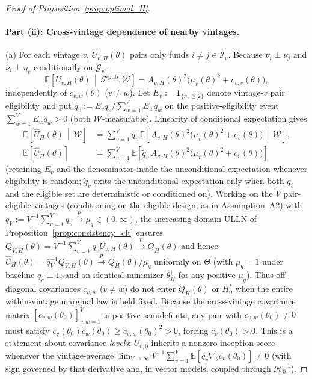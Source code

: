 \begin{proof}[Proof of Proposition~\ref{prop:optimal_H}]
\paragraph{Part (ii): Cross-vintage dependence of nearby vintages.}
(a) For each vintage $v$, $U_{v,H}(\theta)$ pairs only funds $i \neq j \in \mathcal{I}_v$. Because $\nu_i \perp \nu_j$ and $\nu_i \perp \eta_v$ conditionally on $\mathcal{G}_v$,
\[
\mathbb{E}\!\left[U_{v,H}(\theta) \,\middle|\, \mathcal{F}^{\mathrm{pub}},\mathcal{W}\right]
= A_{v,H}(\theta)^2\bigl(\mu_v(\theta)^2 + c_{v,v}(\theta)\bigr),
\]
independently of $c_{v,w}(\theta)$ ($v \neq w$). Let $E_v := \mathbf{1}_{\{n_v \ge 2\}}$ denote vintage-$v$ pair eligibility and put $\tilde{q}_v := E_v q_v / \sum_{w=1}^V E_w q_w$ on the positive-eligibility event $\sum_{w=1}^V E_w q_w > 0$ (both $\mathcal{W}$-measurable). Linearity of conditional expectation gives
\begin{align*}
\mathbb{E}\!\left[\widehat{U}_H(\theta)\,\middle|\,\mathcal{W}\right]
&= \sum_{v=1}^V \tilde{q}_v\,\mathbb{E}\!\left[A_{v,H}(\theta)^2\bigl(\mu_v(\theta)^2 + c_v(\theta)\bigr)\,\middle|\,\mathcal{W}\right], \\
\mathbb{E}\!\left[\widehat{U}_H(\theta)\right]
&= \sum_{v=1}^V \mathbb{E}\!\left[\tilde{q}_v\,A_{v,H}(\theta)^2\bigl(\mu_v(\theta)^2 + c_v(\theta)\bigr)\right]
\end{align*}
(retaining $E_v$ and the denominator inside the unconditional expectation whenever eligibility is random; $\tilde{q}_v$ exits the unconditional expectation only when both $q_v$ and the eligible set are deterministic or conditioned on). Working on the $V$ pair-eligible vintages (conditioning on the eligible design, as in Assumption~A2) with $\bar{q}_V := V^{-1}\sum_{v=1}^V q_v \xrightarrow{p} \mu_q \in (0,\infty)$, the increasing-domain ULLN of Proposition~\ref{prop:consistency_clt} ensures $Q_{V,H}(\theta) = V^{-1}\sum_{v=1}^V q_v U_{v,H}(\theta) \xrightarrow{p} Q_H(\theta)$ and hence $\widehat{U}_H(\theta) = \bar{q}_V^{-1}Q_{V,H}(\theta) \xrightarrow{p} Q_H(\theta)/\mu_q$ uniformly on $\Theta$ (with $\mu_q = 1$ under baseline $q_v \equiv 1$, and an identical minimizer $\theta_H^\dagger$ for any positive $\mu_q$). Thus off-diagonal covariances $c_{v,w}$ ($v \neq w$) do not enter $Q_H(\theta)$ or $H_0^\ast$ when the entire within-vintage marginal law is held fixed. Because the cross-vintage covariance matrix $[c_{v,w}(\theta_0)]_{v,w=1}^V$ is positive semidefinite, any pair with $c_{v,w}(\theta_0) \neq 0$ must satisfy $c_v(\theta_0) c_w(\theta_0) \ge c_{v,w}(\theta_0)^2 > 0$, forcing $c_v(\theta_0) > 0$. This is a statement about covariance \emph{levels}; $U_{v,0}$ inherits a nonzero inception score whenever the vintage-average $\lim_{V\to\infty} V^{-1}\sum_{v=1}^V \mathbb{E}[q_v \nabla_\theta c_v(\theta_0)] \neq 0$ (with sign governed by that derivative and, in vector models, coupled through $\mathcal{H}_0^{-1}$).


\end{proof}
